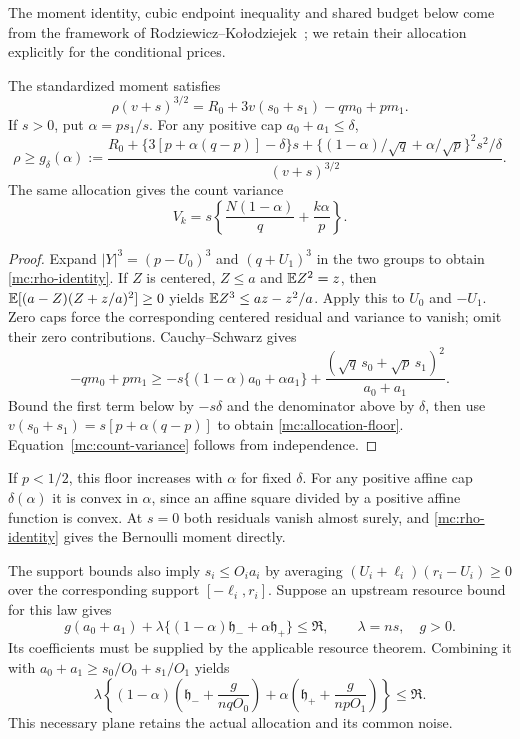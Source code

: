 The moment identity, cubic endpoint inequality and shared budget below
come from the framework of Rodziewicz--Ko\l{}odziejek~\cite{RK2026};
we retain their allocation explicitly for the conditional prices.
\begin{lemma}\label{mc:budget}
The standardized moment satisfies
\begin{equation}\label{mc:rho-identity}
 \rho(v+s)^{3/2}=R_0+3v(s_0+s_1)-qm_0+pm_1.
\end{equation}
If $s>0$, put $\alpha=ps_1/s$. For any positive cap
$a_0+a_1\le\delta$,
\begin{equation}\label{mc:allocation-floor}
 \rho\ge g_\delta(\alpha):=
 \frac{R_0+\{3[p+\alpha(q-p)]-\delta\}s
 +\{(1-\alpha)/\sqrt q+\alpha/\sqrt p\}^2s^2/\delta}
 {(v+s)^{3/2}}.
\end{equation}
The same allocation gives the count variance
\begin{equation}\label{mc:count-variance}
 V_k=s\left\{\frac{N(1-\alpha)}q+\frac{k\alpha}p\right\}.
\end{equation}
\end{lemma}
\begin{proof}
Expand $|Y|^3=(p-U_0)^3$ and $(q+U_1)^3$ in the two groups to
obtain \eqref{mc:rho-identity}. If $Z$ is centered, $Z\le a$ and
$\mathbb E Z^2=z$, then
$\mathbb E[(a-Z)(Z+z/a)^2]\ge0$ yields
$\mathbb E Z^3\le az-z^2/a$. Apply this to $U_0$ and $-U_1$.
Zero caps force the corresponding centered residual and variance
to vanish; omit their zero contributions. Cauchy--Schwarz gives
\[
 -qm_0+pm_1\ge
 -s\{(1-\alpha)a_0+\alpha a_1\}
 +\frac{(\sqrt q\,s_0+\sqrt p\,s_1)^2}{a_0+a_1}.
\]
Bound the first term below by $-s\delta$ and the denominator
above by $\delta$, then use
$v(s_0+s_1)=s[p+\alpha(q-p)]$ to obtain
\eqref{mc:allocation-floor}. Equation~\eqref{mc:count-variance}
follows from independence.
\end{proof}

If $p<1/2$, this floor increases with $\alpha$ for fixed $\delta$.
For any positive affine cap $\delta(\alpha)$ it is convex in
$\alpha$, since an affine square divided by a positive affine
function is convex. At $s=0$ both residuals vanish almost surely,
and \eqref{mc:rho-identity} gives the Bernoulli moment directly.

The support bounds also imply $s_i\le O_i a_i$ by averaging
$(U_i+\ell_i)(r_i-U_i)\ge0$ over the corresponding support
$[-\ell_i,r_i]$. Suppose an upstream resource bound for this law gives
\[
 g(a_0+a_1)+\lambda\{(1-\alpha)\mathfrak h_-
                         +\alpha\mathfrak h_+\}\le\mathfrak R,
 \qquad \lambda=ns,\quad g>0.
\]
Its coefficients must be supplied by the applicable resource theorem.
Combining it with $a_0+a_1\ge s_0/O_0+s_1/O_1$ yields
\begin{equation}\label{mc:signed-plane}
 \lambda\left\{(1-\alpha)
       \left(\mathfrak h_-+\frac g{nqO_0}\right)
 +\alpha\left(\mathfrak h_++\frac g{npO_1}\right)\right\}
 \le\mathfrak R.
\end{equation}
This necessary plane retains the actual allocation and its common noise.

